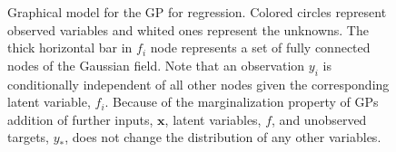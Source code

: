\begin{figure}
\begin{center}
    \end{center}
    \caption{Graphical model for the GP for regression. Colored circles represent observed variables and whited ones represent the unknowns. The thick horizontal bar in $f_i$ node represents a set of fully connected nodes of the Gaussian field. Note that an observation $y_i$ is conditionally independent of all other nodes given the corresponding latent variable, $f_i$. Because of the marginalization property of GPs addition of further inputs, $\mathbf{x}$, latent variables, $f$, and unobserved targets, $y_*$, does not change the distribution of any other variables.}
\end{figure}
